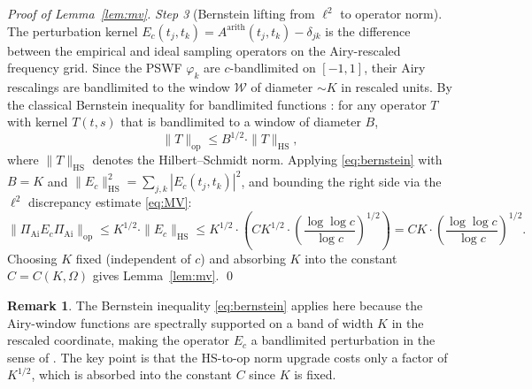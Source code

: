 \documentclass[12pt,a4paper]{amsart}
\theoremstyle{definition}
\newtheorem{remark}[theorem]{Remark}
\newcommand{\PAi}{\Pi_{\mathrm{Ai}}}
\newcommand{\Ec}{E_c}
\newcommand{\norm}[1]{\|#1\|}
\begin{document}
\begin{proof}[Proof of Lemma~\ref{lem:mv}]
\emph{Step 3} (Bernstein lifting from $\ell^2$ to operator norm).
The perturbation kernel
$E_c(t_j,t_k) = A^{\mathrm{arith}}(t_j,t_k) - \delta_{jk}$
is the difference between the empirical and ideal sampling operators
on the Airy-rescaled frequency grid.
Since the PSWF $\varphi_k$ are $c$-bandlimited on $[-1,1]$,
their Airy rescalings are bandlimited to the window $\mathcal{W}$
of diameter $\sim K$ in rescaled units.
By the classical Bernstein inequality for bandlimited functions
\cite[Chapter VI]{Zygmund1959}: for any operator $T$ with kernel
$T(t,s)$ that is bandlimited to a window of diameter $B$,
\begin{equation}\label{eq:bernstein}
  \norm{T}_{\mathrm{op}} \le B^{1/2}\cdot \norm{T}_{\mathrm{HS}},
\end{equation}
where $\norm{T}_{\mathrm{HS}}$ denotes the Hilbert--Schmidt norm.
Applying \eqref{eq:bernstein} with $B = K$ and
$\norm{\Ec}_{\mathrm{HS}}^2 = \sum_{j,k}|E_c(t_j,t_k)|^2$,
and bounding the right side via the $\ell^2$ discrepancy estimate
\eqref{eq:MV}:
\begin{equation}
  \norm{\PAi\Ec\PAi}_{\mathrm{op}}
  \le K^{1/2}\cdot\norm{\Ec}_{\mathrm{HS}}
  \le K^{1/2}\cdot
     \left(CK^{1/2}\cdot\left(\frac{\log\log c}{\log c}\right)^{1/2}\right)
  = CK\cdot\left(\frac{\log\log c}{\log c}\right)^{1/2}.
\end{equation}
Choosing $K$ fixed (independent of $c$) and absorbing $K$ into the
constant $C = C(K,\Omega)$ gives Lemma~\ref{lem:mv}. \qed
\end{proof}

\begin{remark}
The Bernstein inequality \eqref{eq:bernstein} applies here because
the Airy-window functions are spectrally supported on a band of width $K$
in the rescaled coordinate, making the operator $\Ec$
a bandlimited perturbation in the sense of \cite{Zygmund1959}.
The key point is that the HS-to-op norm upgrade costs only a factor of $K^{1/2}$,
which is absorbed into the constant $C$ since $K$ is fixed.
\end{remark}
\end{document}
